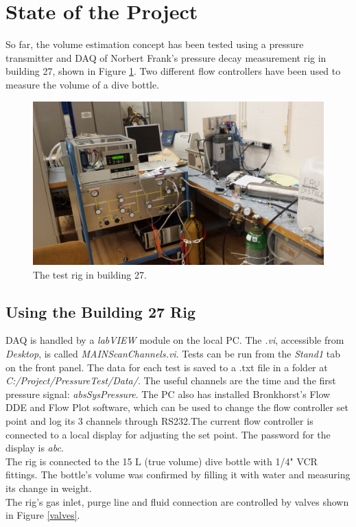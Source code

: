 \documentclass{report}
\begin{document}
	
\section{State of the Project}
So far, the volume estimation concept has been tested using a pressure transmitter and DAQ of Norbert Frank's pressure decay measurement rig in building 27, shown in Figure \ref{b27}. Two different flow controllers have been used to measure the volume of a dive bottle. 
\begin{figure}[h]
\includegraphics[width = \textwidth]{wide}
\caption{The test rig in building 27.}
\label{b27}
\end{figure}
\subsection{Using the Building 27 Rig}
DAQ is handled by a \textit{labVIEW} module on the local PC. The \textit{.vi}, accessible from \textit{Desktop}, is called \textit{MAIN\textunderscore ScanChannels.vi}. Tests can be run from the \textit{Stand1} tab on the front panel. The data for each test is saved to a .txt file in a folder at \textit{C:/Project/PressureTest/Data/}. The useful channels are the time and the first pressure signal: \textit{absSysPressure}. The PC also has installed Bronkhorst's Flow DDE and Flow Plot software, which can be used to change the flow controller set point and log its 3 channels through RS232.The current flow controller is connected to a local display for adjusting the set point. The password for the display is \textit{abc}. \\
The rig is connected to the 15 L (true volume) dive bottle with 1/4" VCR fittings. The bottle's volume was confirmed by filling it with water and measuring its change in weight. \\
The rig's gas inlet, purge line and fluid connection are controlled by valves shown in Figure \ref{valves}.
\end{document}
